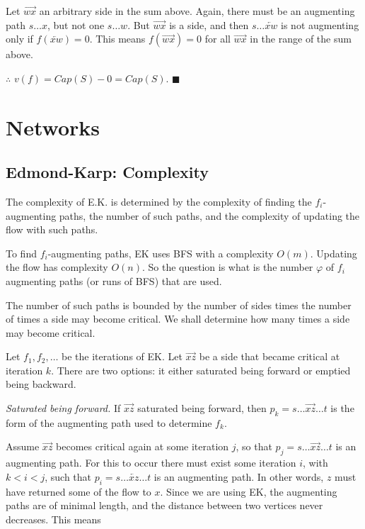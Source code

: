 \documentclass[a4paper]{article}
\begin{document}
Let $\overrightarrow{wx}$ an arbitrary side in the sum above. Again,
there must be an augmenting path $s \ldots x$, but not one 
$s \ldots w$. But $\overrightarrow{wx}$ is a side, and then 
$s \ldots \overleftarrow{xw}$ is not augmenting only if 
$f(\overleftarrow{xw}) = 0$. This means $f(\overrightarrow{wx}) = 0$
for all $\overrightarrow{wx}$ in the range of the sum above.

$\therefore $  $v(f) = Cap(S) - 0 = Cap(S)$. $\blacksquare$

\pagebreak



\section{Networks}

\subsection{Edmond-Karp: Complexity}

The complexity of E.K. is determined by the complexity of finding the
$f_i$-augmenting paths, the number of such paths, and the complexity 
of updating the flow with such paths. 

To find $f_i$-augmenting paths, EK uses BFS with a complexity $O(m)$. Updating
the flow has complexity $O(n)$. So the question is what is the number $\varphi$
of $f_i$ augmenting paths (or runs of BFS) that are used.

The number of such paths is bounded by the number of sides times the number of
times a side may become critical. We shall determine how many times a side may
become critical.

Let $f_1, f_2, \ldots$ be the iterations of EK. Let $\overrightarrow{xz}$ be a
side that became critical at iteration $k$. There are two options: it either
saturated being forward or emptied being backward.

\textit{Saturated being forward.} If $\overrightarrow{xz}$ saturated being
forward, then $p_k = s \ldots \overrightarrow{xz} \ldots t$ is the form of the
augmenting path used to determine $f_k$. 

Assume $\overrightarrow{xz}$ becomes critical again at some iteration $j$, so
that $p_j = s \ldots \overrightarrow{xz} \ldots t$ is an augmenting path. For
this to occur there must exist some iteration $i$, with $k < i < j$, such that
$p_i = s \ldots \overleftarrow{xz} \ldots t$ is an augmenting path. In other
words, $z$ must have returned some of the flow to $x$. Since we are using EK,
the augmenting paths are of minimal length, and the distance between two
vertices never decreases. This means 
\end{document}
